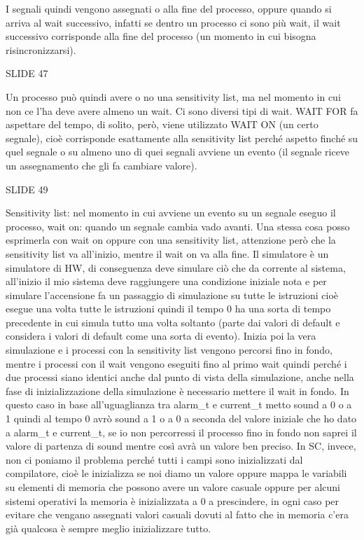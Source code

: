 \documentclass[10pt,a4paper,titlepage]{article}
\begin{document}
I segnali quindi vengono assegnati o alla fine del processo, oppure quando si arriva al wait successivo, infatti se dentro un processo ci sono più wait, il wait successivo corrisponde alla fine del processo (un momento in cui bisogna risincronizzarsi).

SLIDE 47

Un processo può quindi avere o no una sensitivity list, ma nel momento in cui non ce l’ha deve avere almeno un wait.
Ci sono diversi tipi di wait. WAIT FOR fa aspettare del tempo, di solito, però, viene utilizzato WAIT ON (un certo segnale), cioè corrisponde esattamente alla sensitivity list perché aspetto finché su quel segnale o su almeno uno di quei segnali avviene un evento (il segnale riceve un assegnamento che gli fa cambiare valore). 

SLIDE 49

Sensitivity list: nel momento in cui avviene un evento su un segnale eseguo il processo, wait on: quando un segnale cambia vado avanti. Una stessa cosa posso esprimerla con wait on oppure con una sensitivity list, attenzione però che la sensitivity list va all’inizio, mentre il wait on va alla fine. Il simulatore è un simulatore di HW, di conseguenza deve simulare ciò che da corrente al sistema, all’inizio il mio sistema deve raggiungere una condizione iniziale nota e per simulare l’accensione fa un passaggio di simulazione su tutte le istruzioni cioè esegue una volta tutte le istruzioni quindi il tempo 0 ha una sorta di tempo precedente in cui simula tutto una volta soltanto (parte dai valori di default  e considera i valori di default come una sorta di evento). Inizia poi la vera simulazione e i processi con la sensitivity list vengono percorsi fino in fondo, mentre i processi con il wait vengono eseguiti fino al primo wait quindi perché i due processi siano identici anche dal punto di vista della simulazione, anche nella fase di inizializzazione della simulazione è necessario mettere il wait in fondo. In questo caso in base all’uguaglianza tra alarm_t e current_t metto sound a 0 o a 1 quindi al tempo 0 avrò sound a 1 o a 0 a seconda del valore iniziale che ho dato a alarm_t e current_t, se io non percorressi il processo fino in fondo non saprei il valore di partenza di sound mentre così avrà un valore ben preciso. In SC, invece, non ci poniamo il problema perché tutti i campi sono inizializzati dal compilatore, cioè le inizializza se noi diamo un valore oppure mappa le variabili su elementi di memoria che possono avere un valore casuale oppure per alcuni sistemi operativi la memoria è inizializzata a 0 a prescindere, in ogni caso per evitare che vengano assegnati valori casuali dovuti al fatto che in memoria c’era già qualcosa è sempre meglio inizializzare tutto.
\end{document}
